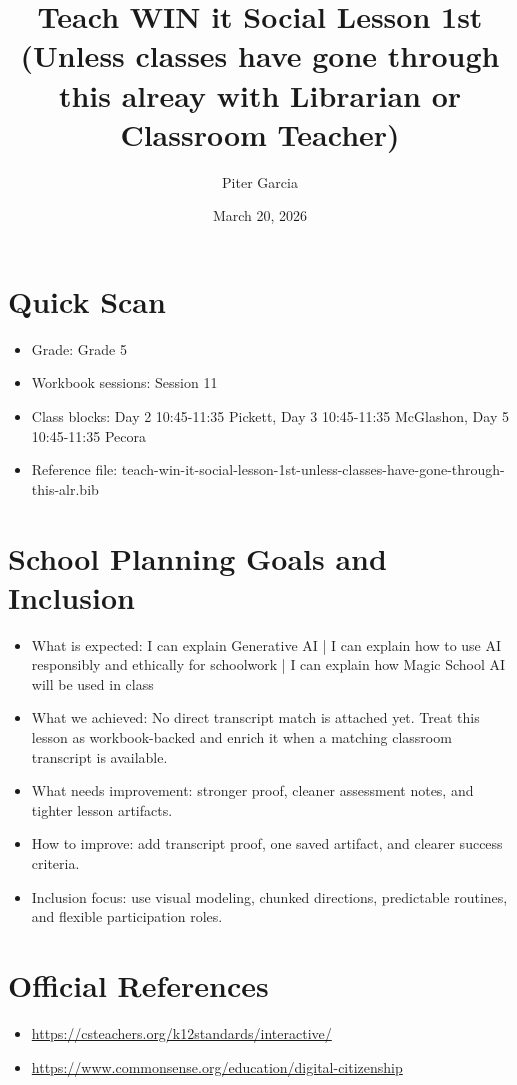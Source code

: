 \documentclass[11pt]{article}
\title{Teach WIN it Social Lesson 1st (Unless classes have gone through this alreay with Librarian or Classroom Teacher)}
\author{Piter Garcia}
\date{March 20, 2026}
\begin{document}
    \maketitle
    \section*{Quick Scan}
    \begin{itemize}[leftmargin=*]
    \item Grade: Grade 5
    \item Workbook sessions: Session 11
    \item Class blocks: Day 2 10:45-11:35 Pickett, Day 3 10:45-11:35 McGlashon, Day 5 10:45-11:35 Pecora
    \item Reference file: teach-win-it-social-lesson-1st-unless-classes-have-gone-through-this-alr.bib
    \end{itemize}
    \section*{School Planning Goals and Inclusion}
    \begin{itemize}[leftmargin=*]
    \item What is expected: I can explain Generative AI | I can explain how to use AI responsibly and ethically for schoolwork | I can explain how Magic School AI will be used in class
    \item What we achieved: No direct transcript match is attached yet. Treat this lesson as workbook-backed and enrich it when a matching classroom transcript is available.
    \item What needs improvement: stronger proof, cleaner assessment notes, and tighter lesson artifacts.
    \item How to improve: add transcript proof, one saved artifact, and clearer success criteria.
    \item Inclusion focus: use visual modeling, chunked directions, predictable routines, and flexible participation roles.
    \end{itemize}
    \section*{Official References}
    \begin{itemize}[leftmargin=*]
    \item \url{https://csteachers.org/k12standards/interactive/}
\item \url{https://www.commonsense.org/education/digital-citizenship}

    \end{itemize}
    
\end{document}
